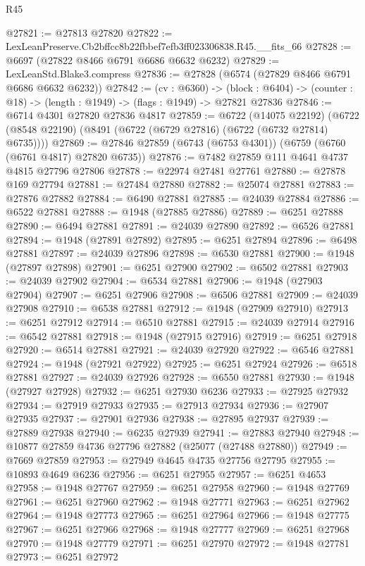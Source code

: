 \begin{lexlean}{R45}
\begin{coremodule}
{@27821 := @27813 @27820
@27822 := LexLeanPreserve.Cb2bffcc8b22fbbef7efb3ff023306838.R45.__fits_66
@27828 := @6697 (@27822 @8466 @6791 @6686 @6632 @6232)
@27829 := LexLeanStd.Blake3.compress
@27836 := @27828 (@6574 (@27829 @8466 @6791 @6686 @6632 @6232))
@27842 := (cv : @6360) ->
  (block : @6404) -> (counter : @18) -> (length : @1949) -> (flags : @1949) -> @27821 @27836
@27846 := @6714 @4301 @27820 @27836 @4817
@27859 := @6722
    (@14075 @22192)
    (@6722 (@8548 @22190) (@8491 (@6722 (@6729 @27816) (@6722 (@6732 @27814) @6735))))
@27869 := @27846 @27859 (@6743 (@6753 @4301)) (@6759 (@6760 (@6761 @4817) @27820 @6735))
@27876 := @7482 @27859 @111 @4641 @4737 @4815 @27796 @27806
@27878 := @22974 @27481 @27761
@27880 := @27878 @169 @27794
@27881 := @27484 @27880
@27882 := @25074 @27881
@27883 := @27876 @27882
@27884 := @6490 @27881
@27885 := @24039 @27884
@27886 := @6522 @27881
@27888 := @1948 (@27885 @27886)
@27889 := @6251 @27888
@27890 := @6494 @27881
@27891 := @24039 @27890
@27892 := @6526 @27881
@27894 := @1948 (@27891 @27892)
@27895 := @6251 @27894
@27896 := @6498 @27881
@27897 := @24039 @27896
@27898 := @6530 @27881
@27900 := @1948 (@27897 @27898)
@27901 := @6251 @27900
@27902 := @6502 @27881
@27903 := @24039 @27902
@27904 := @6534 @27881
@27906 := @1948 (@27903 @27904)
@27907 := @6251 @27906
@27908 := @6506 @27881
@27909 := @24039 @27908
@27910 := @6538 @27881
@27912 := @1948 (@27909 @27910)
@27913 := @6251 @27912
@27914 := @6510 @27881
@27915 := @24039 @27914
@27916 := @6542 @27881
@27918 := @1948 (@27915 @27916)
@27919 := @6251 @27918
@27920 := @6514 @27881
@27921 := @24039 @27920
@27922 := @6546 @27881
@27924 := @1948 (@27921 @27922)
@27925 := @6251 @27924
@27926 := @6518 @27881
@27927 := @24039 @27926
@27928 := @6550 @27881
@27930 := @1948 (@27927 @27928)
@27932 := @6251 @27930 @6236
@27933 := @27925 @27932
@27934 := @27919 @27933
@27935 := @27913 @27934
@27936 := @27907 @27935
@27937 := @27901 @27936
@27938 := @27895 @27937
@27939 := @27889 @27938
@27940 := @6235 @27939
@27941 := @27883 @27940
@27948 := @10877 @27859 @4736 @27796 @27882 (@25077 (@27488 @27880))
@27949 := @7669 @27859
@27953 := @27949 @4645 @4735 @27756 @27795
@27955 := @10893 @4649 @6236
@27956 := @6251 @27955
@27957 := @6251 @4653
@27958 := @1948 @27767
@27959 := @6251 @27958
@27960 := @1948 @27769
@27961 := @6251 @27960
@27962 := @1948 @27771
@27963 := @6251 @27962
@27964 := @1948 @27773
@27965 := @6251 @27964
@27966 := @1948 @27775
@27967 := @6251 @27966
@27968 := @1948 @27777
@27969 := @6251 @27968
@27970 := @1948 @27779
@27971 := @6251 @27970
@27972 := @1948 @27781
@27973 := @6251 @27972
}
\end{coremodule}
\end{lexlean}
